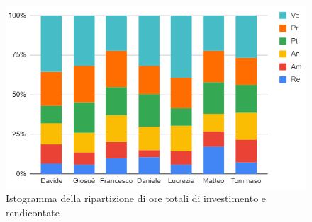 \begin{figure}[H]
    \centering
    \includegraphics[scale = 0.5]{components/img/totale_isto.png}
    \caption{ Istogramma della ripartizione di ore totali di investimento e rendicontate}
    \label{fig:logo}
\end{figure}
